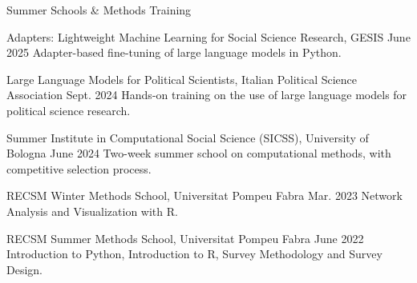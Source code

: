 \documentclass{cv}
\begin{document}
\begin{rSection}{Summer Schools \& Methods Training}

\begin{trainingEntry}
{Adapters: Lightweight Machine Learning for Social Science Research, GESIS}
{June 2025}
{Adapter-based fine-tuning of large language models in Python.}
\end{trainingEntry}

\begin{trainingEntry}
{Large Language Models for Political Scientists, Italian Political Science Association}
{Sept. 2024}
{Hands-on training on the use of large language models for political science research.}
\end{trainingEntry}

\begin{trainingEntry}
{Summer Institute in Computational Social Science (SICSS), University of Bologna}
{June 2024}
{Two-week summer school on computational methods, with competitive selection process.}
\end{trainingEntry}

\begin{trainingEntry}
{RECSM Winter Methods School, Universitat Pompeu Fabra}
{Mar. 2023}
{Network Analysis and Visualization with R.}
\end{trainingEntry}

\begin{trainingEntry}
{RECSM Summer Methods School, Universitat Pompeu Fabra}
{June 2022}
{Introduction to Python, Introduction to R, Survey Methodology and Survey Design.}
\end{trainingEntry}

\end{rSection}

\end{document}
